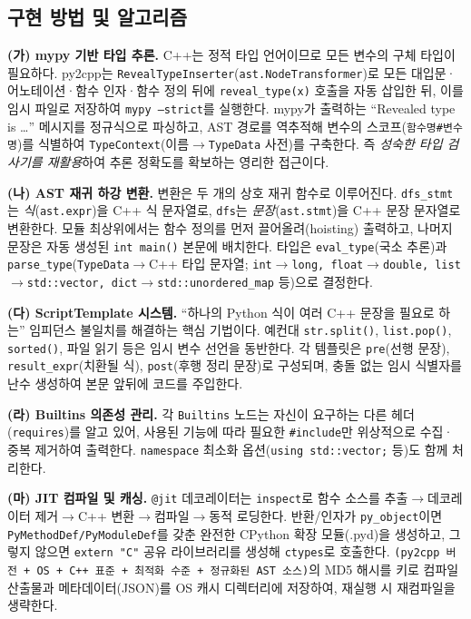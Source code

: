 \documentclass[10pt]{article}
\begin{document}
\subsection{구현 방법 및 알고리즘}

\textbf{(가) mypy 기반 타입 추론.} C++는 정적 타입 언어이므로 모든 변수의 구체 타입이 필요하다. py2cpp는 \texttt{RevealTypeInserter}(\texttt{ast.NodeTransformer})로 모든 대입문·어노테이션·함수 인자·함수 정의 뒤에 \texttt{reveal\_type(x)} 호출을 자동 삽입한 뒤, 이를 임시 파일로 저장하여 \texttt{mypy --strict}를 실행한다. mypy가 출력하는 ``Revealed type is \dots'' 메시지를 정규식으로 파싱하고, AST 경로를 역추적해 변수의 스코프(\texttt{함수명\#변수명})를 식별하여 \texttt{TypeContext}(이름$\to$\texttt{TypeData} 사전)를 구축한다. 즉 \emph{성숙한 타입 검사기를 재활용}하여 추론 정확도를 확보하는 영리한 접근이다.

\textbf{(나) AST 재귀 하강 변환.} 변환은 두 개의 상호 재귀 함수로 이루어진다. \texttt{dfs\_stmt}는 \emph{식}(\texttt{ast.expr})을 C++ 식 문자열로, \texttt{dfs}는 \emph{문장}(\texttt{ast.stmt})을 C++ 문장 문자열로 변환한다. 모듈 최상위에서는 함수 정의를 먼저 끌어올려(hoisting) 출력하고, 나머지 문장은 자동 생성된 \texttt{int main()} 본문에 배치한다. 타입은 \texttt{eval\_type}(국소 추론)과 \texttt{parse\_type}(\texttt{TypeData}$\to$C++ 타입 문자열; \texttt{int$\to$long, float$\to$double, list$\to$std::vector, dict$\to$std::unordered\_map} 등)으로 결정한다.

\textbf{(다) ScriptTemplate 시스템.} ``하나의 Python 식이 여러 C++ 문장을 필요로 하는'' 임피던스 불일치를 해결하는 핵심 기법이다. 예컨대 \texttt{str.split()}, \texttt{list.pop()}, \texttt{sorted()}, 파일 읽기 등은 임시 변수 선언을 동반한다. 각 템플릿은 \texttt{pre}(선행 문장), \texttt{result\_expr}(치환될 식), \texttt{post}(후행 정리 문장)로 구성되며, 충돌 없는 임시 식별자를 난수 생성하여 본문 앞뒤에 코드를 주입한다.

\textbf{(라) Builtins 의존성 관리.} 각 \texttt{Builtins} 노드는 자신이 요구하는 다른 헤더(\texttt{requires})를 알고 있어, 사용된 기능에 따라 필요한 \texttt{\#include}만 위상적으로 수집·중복 제거하여 출력한다. \texttt{namespace} 최소화 옵션(\texttt{using std::vector;} 등)도 함께 처리한다.

\textbf{(마) JIT 컴파일 및 캐싱.} \texttt{@jit} 데코레이터는 \texttt{inspect}로 함수 소스를 추출$\to$데코레이터 제거$\to$C++ 변환$\to$컴파일$\to$동적 로딩한다. 반환/인자가 \texttt{py\_object}이면 \texttt{PyMethodDef/PyModuleDef}를 갖춘 완전한 CPython 확장 모듈(.pyd)을 생성하고, 그렇지 않으면 \texttt{extern "C"} 공유 라이브러리를 생성해 \texttt{ctypes}로 호출한다. \texttt{(py2cpp 버전 + OS + C++ 표준 + 최적화 수준 + 정규화된 AST 소스)}의 MD5 해시를 키로 컴파일 산출물과 메타데이터(JSON)를 OS 캐시 디렉터리에 저장하여, 재실행 시 재컴파일을 생략한다.
\end{document}
